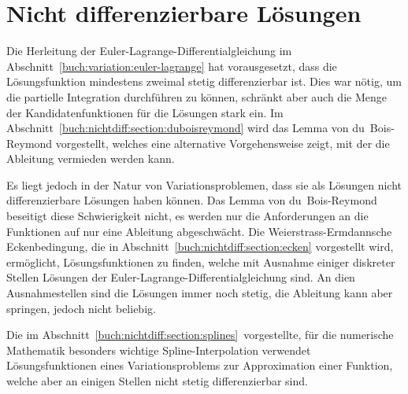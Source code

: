 %
%
%
\chapter{Nicht differenzierbare Lösungen
\label{buch:chapter:nichtdiff}}
Die Herleitung der Euler-Lagrange-Differentialgleichung im
Abschnitt~\ref{buch:variation:euler-lagrange} hat vorausgesetzt,
dass die Lösungsfunktion mindestens zweimal stetig differenzierbar ist.
Dies war nötig, um die partielle Integration durchführen zu können,
schränkt aber auch die Menge der Kandidatenfunktionen für die Lösungen
stark ein.
Im Abschnitt~\ref{buch:nichtdiff:section:duboisreymond} wird 
das Lemma von du~Bois-Reymond vorgestellt, welches eine alternative
Vorgehensweise zeigt, mit der die Ableitung vermieden werden kann.

Es liegt jedoch in der Natur von Variationsproblemen, dass sie 
als Lösungen nicht differenzierbare Lösungen haben können.
Das Lemma von du~Bois-Reymond beseitigt diese Schwierigkeit
nicht, es werden nur die Anforderungen an die Funktionen auf 
nur eine Ableitung abgeschwächt.
Die Weierstrass-Ermdannsche Eckenbedingung, die in
Abschnitt~\ref{buch:nichtdiff:section:ecken} vorgestellt
wird, ermöglicht, Lösungsfunktionen zu finden, welche mit Ausnahme
einiger diskreter Stellen Lösungen der Euler-Lagrange-Differentialgleichung
sind.
An dien Ausnahmestellen sind die Lösungen immer noch stetig, die
Ableitung kann aber springen, jedoch nicht beliebig.

Die im Abschnitt~\ref{buch:nichtdiff:section:splines} vorgestellte,
für die numerische Mathematik besonders wichtige
Spline-Interpolation verwendet Lösungsfunktionen eines
Variationsproblems zur Approximation einer Funktion, welche aber an
einigen Stellen nicht stetig differenzierbar sind.






